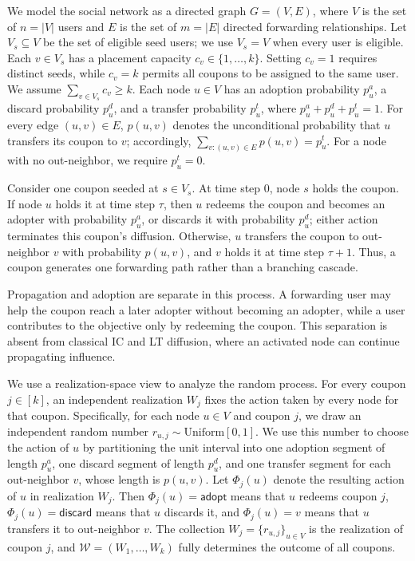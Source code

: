\documentclass[sigconf,balance=false]{acmart}
\begin{document}
We model the social network as a directed graph $G=(V,E)$, where $V$ is
the set of $n=|V|$ users and $E$ is the set of $m=|E|$ directed
forwarding relationships.
Let $V_s\subseteq V$ be the set of eligible seed users; we use $V_s=V$
when every user is eligible.
Each $v\in V_s$ has a placement capacity $c_v\in\{1,\ldots,k\}$.
Setting $c_v=1$ requires distinct seeds, while $c_v=k$ permits all
coupons to be assigned to the same user.
We assume $\sum_{v\in V_s}c_v\geq k$.
Each node $u\in V$ has an adoption probability $p_u^a$, a discard
probability $p_u^d$, and a transfer probability $p_u^t$, where
$p_u^a+p_u^d+p_u^t=1$.
For every edge $(u,v)\in E$, $p(u,v)$ denotes the unconditional
probability that $u$ transfers its coupon to $v$; accordingly,
$\sum_{v:(u,v)\in E}p(u,v)=p_u^t$.
For a node with no out-neighbor, we require $p_u^t=0$.

Consider one coupon seeded at $s\in V_s$.
At time step $0$, node $s$ holds the coupon.
If node $u$ holds it at time step $\tau$, then $u$ redeems the coupon and
becomes an adopter with probability $p_u^a$, or discards it with
probability $p_u^d$; either action terminates this coupon's diffusion.
Otherwise, $u$ transfers the coupon to out-neighbor $v$ with probability
$p(u,v)$, and $v$ holds it at time step $\tau+1$.
Thus, a coupon generates one forwarding path rather than a branching
cascade.

Propagation and adoption are separate in this process.
A forwarding user may help the coupon reach a later adopter without
becoming an adopter, while a user contributes to the objective only by
redeeming the coupon.
This separation is absent from classical IC and LT diffusion, where an
activated node can continue propagating influence.

We use a realization-space view to analyze the random process.
For every coupon $j\in[k]$, an independent realization $W_j$ fixes the
action taken by every node for that coupon.
Specifically, for each node $u\in V$ and coupon $j$, we draw an
independent random number $r_{u,j}\sim\mathrm{Uniform}[0,1]$.
We use this number to choose the action of $u$ by partitioning the unit
interval into one adoption segment of length $p_u^a$, one discard
segment of length $p_u^d$, and one transfer segment for each
out-neighbor $v$, whose length is $p(u,v)$.
Let $\Phi_j(u)$ denote the resulting action of $u$ in realization $W_j$.
Then $\Phi_j(u)=\textsf{adopt}$ means that $u$ redeems coupon $j$,
$\Phi_j(u)=\textsf{discard}$ means that $u$ discards it, and
$\Phi_j(u)=v$ means that $u$ transfers it to out-neighbor $v$.
The collection $W_j=\{r_{u,j}\}_{u\in V}$ is the realization of coupon
$j$, and $\mathcal{W}=(W_1,\ldots,W_k)$ fully determines the outcome of
all coupons.
\end{document}
